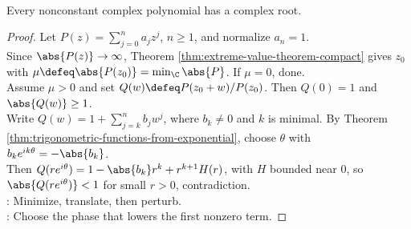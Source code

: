 \begin{theorem} \label{thm:fundamental-theorem-algebra-exponential-proof} \\
Every nonconstant complex polynomial has a complex root.
\begin{proof}
Let $P(z)=\sum_{j=0}^{n}a_jz^j$, $n\geq1$, and normalize $a_n=1$.\\
Since $\abs{P(z)}\to\infty$, Theorem \ref{thm:extreme-value-theorem-compact} gives $z_0$ with $\mu\defeq\abs{P(z_0)}=\min_{\C}\abs{P}$. If $\mu=0$, done.\\
Assume $\mu>0$ and set $Q(w)\defeq P(z_0+w)/P(z_0)$. Then $Q(0)=1$ and $\abs{Q(w)}\geq1$.\\
Write $Q(w)=1+\sum\limits_{j=k}^{n}b_jw^j$, where $b_k\neq0$ and $k$ is minimal. By Theorem \ref{thm:trigonometric-functions-from-exponential}, choose $\theta$ with $b_ke^{ik\theta}=-\abs{b_k}$.\\
Then $Q(re^{i\theta})=1-\abs{b_k}r^k+r^{k+1}H(r)$, with $H$ bounded near $0$, so $\abs{Q(re^{i\theta})}<1$ for small $r>0$, contradiction.\\
: Minimize, translate, then perturb.\\
: Choose the phase that lowers the first nonzero term.
\end{proof}
\end{theorem}

